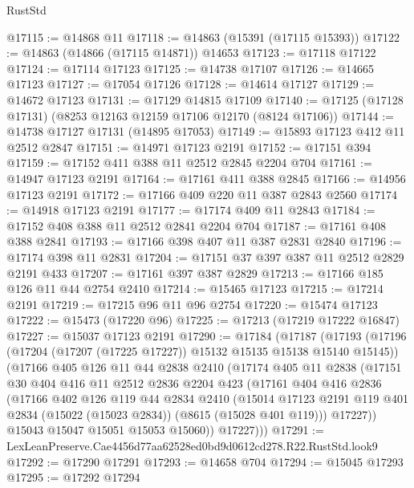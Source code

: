 \begin{lexlean}{RustStd}
\begin{coremodule}
@17115 := @14868 @11
@17118 := @14863 (@15391 (@17115 @15393))
@17122 := @14863 (@14866 (@17115 @14871)) @14653
@17123 := @17118 @17122
@17124 := @17114 @17123
@17125 := @14738 @17107
@17126 := @14665 @17123
@17127 := @17054 @17126
@17128 := @14614 @17127
@17129 := @14672 @17123
@17131 := @17129 @14815 @17109
@17140 := @17125 (@17128 @17131) (@8253 @12163 @12159 @17106 @12170 (@8124 @17106))
@17144 := @14738 @17127 @17131 (@14895 @17053)
@17149 := @15893 @17123 @412 @11 @2512 @2847
@17151 := @14971 @17123 @2191
@17152 := @17151 @394
@17159 := @17152 @411 @388 @11 @2512 @2845 @2204 @704
@17161 := @14947 @17123 @2191
@17164 := @17161 @411 @388 @2845
@17166 := @14956 @17123 @2191
@17172 := @17166 @409 @220 @11 @387 @2843 @2560
@17174 := @14918 @17123 @2191
@17177 := @17174 @409 @11 @2843
@17184 := @17152 @408 @388 @11 @2512 @2841 @2204 @704
@17187 := @17161 @408 @388 @2841
@17193 := @17166 @398 @407 @11 @387 @2831 @2840
@17196 := @17174 @398 @11 @2831
@17204 := @17151 @37 @397 @387 @11 @2512 @2829 @2191 @433
@17207 := @17161 @397 @387 @2829
@17213 := @17166 @185 @126 @11 @44 @2754 @2410
@17214 := @15465 @17123
@17215 := @17214 @2191
@17219 := @17215 @96 @11 @96 @2754
@17220 := @15474 @17123
@17222 := @15473 (@17220 @96)
@17225 := @17213 (@17219 @17222 @16847)
@17227 := @15037 @17123 @2191
@17290 := @17184
    (@17187
      (@17193
        (@17196 (@17204 (@17207 (@17225 @17227)) @15132 @15135 @15138 @15140 @15145))
        (@17166
          @405
          @126
          @11
          @44
          @2838
          @2410
          (@17174
            @405
            @11
            @2838
            (@17151
              @30
              @404
              @416
              @11
              @2512
              @2836
              @2204
              @423
              (@17161
                @404
                @416
                @2836
                (@17166
                  @402
                  @126
                  @119
                  @44
                  @2834
                  @2410
                  (@15014
                    @17123
                    @2191
                    @119
                    @401
                    @2834
                    (@15022 (@15023 @2834))
                    (@8615 (@15028 @401 @119)))
                  @17227))
              @15043
              @15047
              @15051
              @15053
              @15060))
          @17227)))
@17291 := LexLeanPreserve.Cae4456d77aa62528ed0bd9d0612cd278.R22.RustStd.look9
@17292 := @17290 @17291
@17293 := @14658 @704
@17294 := @15045 @17293
@17295 := @17292 @17294

\end{coremodule}
\end{lexlean}
